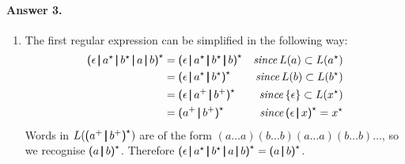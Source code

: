 \paragraph{Answer 3.}

\begin{enumerate}

  \item The first regular expression can be simplified in the
    following way:
    \begin{align*}
      \textsf{(} \epsilon \, \pmb{\lvert}{} \, a^{\star}{} \, \pmb{\lvert}{} \,
      b^{\star}{} \, \pmb{\lvert}{} \, a \, \pmb{\lvert}{} \, b \textsf{)}^{\star}
      &= \textsf{(} \epsilon \, \pmb{\lvert}{} \, a^{\star}{} \, \pmb{\lvert}{} \,
      b^{\star}{} \, \pmb{\lvert}{} \, b\textsf{)}^{\star} & \text{\emph{since}}
      \, L(a) \subset L(a^{\star})\\
      &= \textsf{(} \epsilon \, \pmb{\lvert}{} \, a^{\star}{} \, \pmb{\lvert}{} \,
      b^{\star}\textsf{)}^{\star} & \text{\emph{since}} \,
      L(b) \subset L(b^{\star})\\
      &= \textsf{(} \epsilon \, \pmb{\lvert}{} \, a^{+}{} \, \pmb{\lvert}{} \,
      b^{+}\textsf{)}^{\star} & \text{\emph{since}} \, \{\epsilon\}
      \subset L(x^{\star})\\
      &= \textsf{(} a^{+}{} \, \pmb{\lvert}{} \, b^{+}\textsf{)}^{\star} &
      \text{\emph{since}} \, \textsf{(}\epsilon \, \pmb{\lvert}{} \,
      x\textsf{)}^{\star} = x^{\star}
    \end{align*}
    Words in \(L(\textsf{(} a^{+}{} \, \pmb{\lvert}{} \,
    b^{+}\textsf{)}^{\star})\) are of the form \((a\ldots a)(b
    \ldots b)(a\ldots a)(b\ldots b)\ldots\), so we recognise
    \(\textsf{(} a \, \pmb{\lvert}{} \, b\textsf{)}^{\star}\). Therefore
    \(\textsf{(} \epsilon \, \pmb{\lvert}{} \, a^{\star}{} \, \pmb{\lvert}{} \,
    b^{\star}{} \, \pmb{\lvert}{} \, a \, \pmb{\lvert}{} \, b \textsf{)}^{\star} =
    \textsf{(} a \, \pmb{\lvert}{} \, b\textsf{)}^{\star}\).


\end{enumerate}
